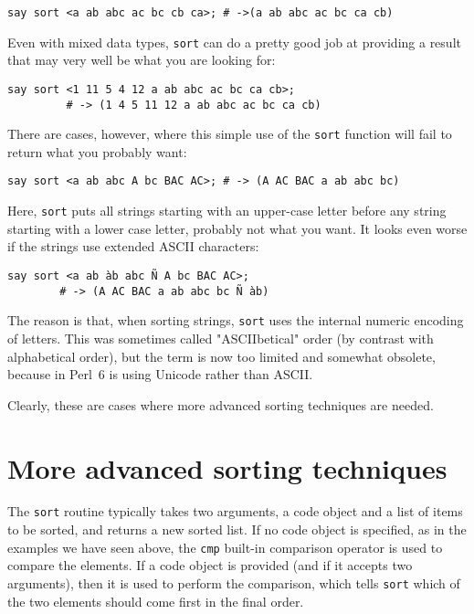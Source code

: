 \begin{verbatim}
say sort <a ab abc ac bc cb ca>; # ->(a ab abc ac bc ca cb)
\end{verbatim}

Even with mixed data types, {\tt sort} can do a pretty good 
job at providing a result that may very well be what 
you are looking for:

\begin{verbatim}
say sort <1 11 5 4 12 a ab abc ac bc ca cb>;
         # -> (1 4 5 11 12 a ab abc ac bc ca cb)
\end{verbatim}

There are cases, however, where this simple use of the 
{\tt sort} function will fail to return what you 
probably want:

\begin{verbatim}
say sort <a ab abc A bc BAC AC>; # -> (A AC BAC a ab abc bc)
\end{verbatim}
%

Here, {\tt sort} puts all strings starting with an 
upper-case letter before any string starting with a 
lower case letter, probably not what you want. It 
looks even worse if the strings use extended 
ASCII characters:

\begin{verbatim}
say sort <a ab àb abc Ñ A bc BAC AC>;
        # -> (A AC BAC a ab abc bc Ñ àb)
\end{verbatim}
%

The reason is that, when sorting strings, {\tt sort} 
uses the internal numeric encoding of letters. This 
was sometimes called "ASCIIbetical" order (by contrast 
with alphabetical order), but the term is now too limited 
and somewhat obsolete, because in Perl~6 is using Unicode 
rather than ASCII. 

Clearly, these are cases where more advanced sorting 
techniques are needed. 

\section{More advanced sorting techniques}
\label{advanced_sort}

The {\tt sort} routine typically takes two arguments, 
a code object and a list of items to be sorted, and returns 
a new sorted list. If no code object is specified, as in the 
examples we have seen above, the {\tt cmp} built-in comparison 
operator is used to compare the elements. If 
a code object is provided (and if it accepts two 
arguments), then it is used to perform the comparison, 
which tells {\tt sort} which of the two elements should 
come first in the final order.

